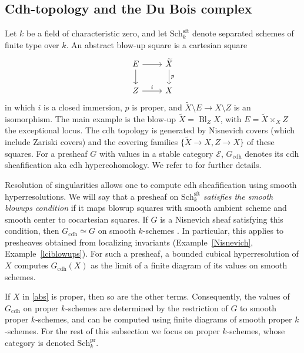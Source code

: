 \documentclass{amsart}
\theoremstyle{plain}
\theoremstyle{definition}
\newcommand{\cE}{{\mathcal E}}
\newcommand{\Sch}{\mathrm{Sch}}
\DeclareMathOperator{\Bl}{Bl}
\newcommand{\cdh}{\mathrm{cdh}}
\newcommand{\sft}{\mathrm{sft}}
\begin{document}
\medskip


\subsection{Cdh-topology and the Du Bois complex}\label{secDBrecollections}

Let $k$ be a field of characteristic zero, and let $\Sch^{\sft}_k$
denote separated schemes of finite type over $k$. An abstract blow-up square is a cartesian square
\begin{equation}\label{abs}
\begin{tikzcd}
E\arrow[r]\arrow[d]&\widetilde X\arrow[d,"p"]\\
Z\arrow[r,"i"]&X
\end{tikzcd}
\end{equation}
in which $i$ is a closed immersion, $p$ is proper, and
$\widetilde X\setminus E\to X\setminus Z$ is an isomorphism. The main example is the blow-up $\widetilde X=\Bl_Z X$, with
$E=\widetilde X\times_X Z$ the exceptional locus.
The cdh topology is generated by Nisnevich covers (which include Zariski covers) and the covering families $\{\widetilde X\to X,Z\to X\}$ of these squares. For a presheaf $G$ with values in a stable category $\cE$, $G_{\cdh}$
denotes its cdh sheafification aka cdh hypercohomology. We refer to \cite{Nis89,Voe10,CHSW08} for further details. 

Resolution of singularities allows one to compute cdh sheafification using smooth hyperresolutions. We will say that a presheaf on
$\Sch^{\mathrm{sft}}_k$ \emph{satisfies the smooth blowups condition} if it maps blowup squares with smooth ambient scheme and smooth center to cocartesian squares. If $G$ is a Nisnevich sheaf satisfying this condition, then $G_{\cdh}\simeq G$ on smooth $k$-schemes
\cite[Lemmas~4.3--4.6]{Voe10}. In particular, this applies to presheaves obtained from localizing invariants
(Example~\ref{Nisnevich}, Example~\ref{lciblowups}). For such a presheaf, a bounded cubical hyperresolution of $X$ computes $G_{\cdh}(X)$ as the limit of a finite diagram of its values on smooth schemes.

If $X$ in \eqref{abs} is proper, then so are the other terms. Consequently, the values of $G_{\cdh}$ on proper $k$-schemes are determined by the restriction of $G$ to smooth proper $k$-schemes, and can be computed using finite diagrams of smooth proper $k$-schemes. For the rest of this subsection we focus on proper $k$-schemes, whose category is denoted
$\Sch^{\mathrm{pr}}_k$.
\end{document}
